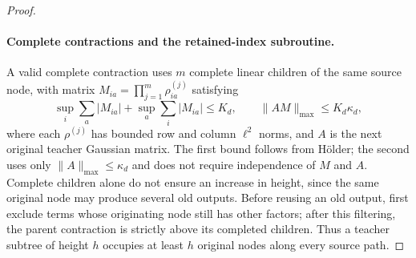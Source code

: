 \documentclass[a4paper]{tufte-handout}
\begin{document}
\begin{fullwidth}
\begin{proof}
\paragraph{Complete contractions and the retained-index subroutine.}
A valid complete contraction uses $m$ complete linear children of the same source node, with matrix
$M_{ia}=\prod_{j=1}^m\rho^{(j)}_{ia}$ satisfying
\begin{equation}\label{fp:metric-schur}
 \sup_i\sum_a|M_{ia}|+\sup_a\sum_i|M_{ia}|\le K_d,
 \qquad \|AM\|_{\max}\le K_d\kappa_d,
\end{equation}
where each $\rho^{(j)}$ has bounded row and column $\ell^2$ norms, and $A$ is the next original teacher Gaussian matrix.
The first bound follows from H\"older; the second uses only $\|A\|_{\max}\le\kappa_d$ and does not require independence of $M$ and $A$.
Complete children alone do not ensure an increase in height, since the same original node may produce several old outputs.
Before reusing an old output, first exclude terms whose originating node still has other factors; after this filtering,
the parent contraction is strictly above its completed children. Thus a teacher subtree of height $h$ occupies at least $h$ original nodes along every source path.


\end{proof}
\end{fullwidth}
\end{document}

